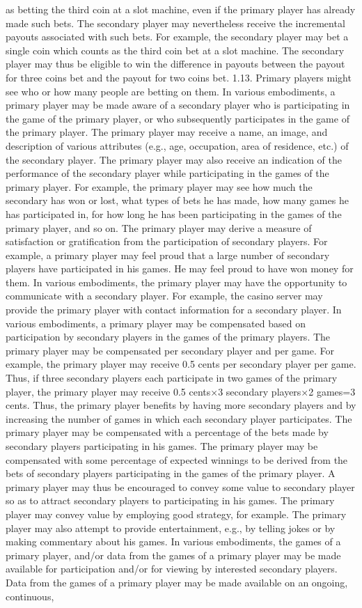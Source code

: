 \documentclass[11pt,a4paper]{article}
\begin{document}
as betting the third coin at a slot machine, even if the primary player has already made such bets. The secondary player may nevertheless receive the incremental payouts associated with such bets. For example, the secondary player may bet a single coin which counts as the third coin bet at a slot machine. The secondary player may thus be eligible to win the difference in payouts between the payout for three coins bet and the payout for two coins bet. 1.13. Primary players might see who or how many people are betting on them. In various embodiments, a primary player may be made aware of a secondary player who is participating in the game of the primary player, or who subsequently participates in the game of the primary player. The primary player may receive a name, an image, and description of various attributes (e.g., age, occupation, area of residence, etc.) of the secondary player. The primary player may also receive an indication of the performance of the secondary player while participating in the games of the primary player. For example, the primary player may see how much the secondary has won or lost, what types of bets he has made, how many games he has participated in, for how long he has been participating in the games of the primary player, and so on. The primary player may derive a measure of satisfaction or gratification from the participation of secondary players. For example, a primary player may feel proud that a large number of secondary players have participated in his games. He may feel proud to have won money for them. In various embodiments, the primary player may have the opportunity to communicate with a secondary player. For example, the casino server may provide the primary player with contact information for a secondary player. In various embodiments, a primary player may be compensated based on participation by secondary players in the games of the primary players. The primary player may be compensated per secondary player and per game. For example, the primary player may receive 0.5 cents per secondary player per game. Thus, if three secondary players each participate in two games of the primary player, the primary player may receive 0.5 cents×3 secondary players×2 games=3 cents. Thus, the primary player benefits by having more secondary players and by increasing the number of games in which each secondary player participates. The primary player may be compensated with a percentage of the bets made by secondary players participating in his games. The primary player may be compensated with some percentage of expected winnings to be derived from the bets of secondary players participating in the games of the primary player. A primary player may thus be encouraged to convey some value to secondary player so as to attract secondary players to participating in his games. The primary player may convey value by employing good strategy, for example. The primary player may also attempt to provide entertainment, e.g., by telling jokes or by making commentary about his games. In various embodiments, the games of a primary player, and/or data from the games of a primary player may be made available for participation and/or for viewing by interested secondary players. Data from the games of a primary player may be made available on an ongoing, continuous, 
\end{document}
